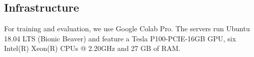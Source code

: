 
\subsection{Infrastructure}
For training and evaluation, we use Google Colab Pro. The servers run Ubuntu 18.04 LTS (Bionic Beaver) and feature a Tesla P100-PCIE-16GB GPU, six Intel(R) Xeon(R) CPUs @ 2.20GHz and 27 GB of RAM. 